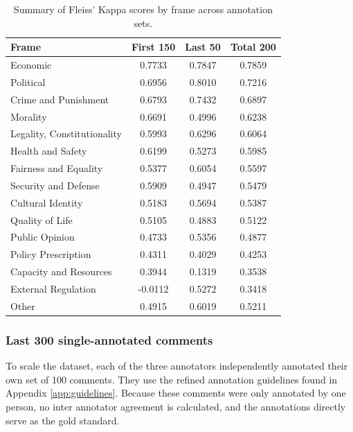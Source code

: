 \documentclass[
10pt, %
a4paper, %
oneside, %
headinclude,footinclude, %
] {book}%
\begin{document}
\begin{table}[htbp]
\small
\centering
\begin{tabular}{|l|c|c|c|}
\hline
\textbf{Frame} & \textbf{First 150} & \textbf{Last 50} & \textbf{Total 200} \\
\hline
Economic & 0.7733 & 0.7847 & 0.7859 \\ \hline
Political & 0.6956 & 0.8010 & 0.7216 \\ \hline
Crime and Punishment & 0.6793 & 0.7432 & 0.6897 \\ \hline
Morality & 0.6691 & 0.4996 & 0.6238 \\ \hline
Legality, Constitutionality & 0.5993 & 0.6296 & 0.6064 \\ \hline
Health and Safety & 0.6199 & 0.5273 & 0.5985 \\ \hline
Fairness and Equality & 0.5377 & 0.6054 & 0.5597 \\ \hline
Security and Defense & 0.5909 & 0.4947 & 0.5479 \\ \hline
Cultural Identity & 0.5183 & 0.5694 & 0.5387 \\ \hline
Quality of Life & 0.5105 & 0.4883 & 0.5122 \\ \hline
Public Opinion & 0.4733 & 0.5356 & 0.4877 \\ \hline
Policy Prescription & 0.4311 & 0.4029 & 0.4253 \\ \hline
Capacity and Resources & 0.3944 & 0.1319 & 0.3538 \\ \hline
External Regulation & -0.0112 & 0.5272 & 0.3418 \\ \hline
Other & 0.4915 & 0.6019 & 0.5211 \\ \hline
\end{tabular}
\caption{Summary of Fleiss' Kappa scores by frame across annotation sets.}
\label{tab:fleiss_kappa_summary}
\end{table}



\subsubsection{Last 300 single-annotated comments}
To scale the dataset, each of the three annotators independently annotated  their own set of 100 comments. They use the refined annotation guidelines found in Appendix \ref{app:guidelines}. Because these comments were only annotated by one person, no inter annotator agreement is calculated, and the annotations directly serve as the gold standard.
\end{document}
